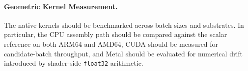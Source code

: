 \paragraph{Geometric Kernel Measurement.}
The native kernels should be benchmarked across batch sizes and
substrates.  In particular, the CPU assembly path should be compared
against the scalar reference on both ARM64 and AMD64, CUDA should be
measured for candidate-batch throughput, and Metal should be evaluated
for numerical drift introduced by shader-side \texttt{float32}
arithmetic.

